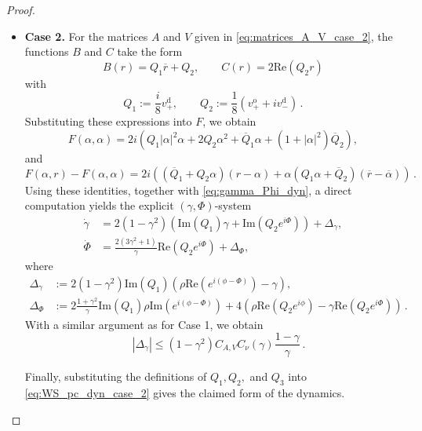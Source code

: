 \documentclass[10pt]{article}
\theoremstyle{definition}
\theoremstyle{definition}
\numberwithin{equation}{section}
\newcommand{\im}[1]{\mathrm{Im} \left(#1\right)}
\newcommand{\re}[1]{\mathrm{Re}\left(#1\right)}
\newcommand{\alphaBar}{\overline{\alpha}}
\newcommand{\vDPlus}{v_+^{\text{d}}}
\newcommand{\vDMinus}{v_-^{\text{d}}}
\newcommand{\vOPlus}{v_+^{\text{o}}}
\newcommand{\DeltaGamma}{\Delta_{\gamma}}
\newcommand{\DeltaPhi}{\Delta_{\Phi}}
\begin{document}
\begin{proof}
\begin{itemize}
    \item \textbf{Case 2.}
    For the matrices $A$ and $V$ given in \eqref{eq:matrices_A_V_case_2}, the functions $B$ and $C$ take the form
    \begin{equation*}
    B(r) = Q_1 \overline{r} + Q_2, \qquad C(r) = 2\re{Q_2 r}
    \end{equation*}
    with 
    \begin{equation*}
    Q_1 := \frac{i}{8} \vDPlus, \qquad Q_2 := \frac{1}{8} \left( \vOPlus + i \vDMinus \right) \, .
    \end{equation*}
    Substituting these expressions into $F$, we obtain
    \begin{equation*}
    F(\alpha, \alpha) = 2i \left( Q_1 |\alpha|^2 \alpha + 2 Q_2 \alpha^2 + \overline{Q}_1 \alpha + (1 + |\alpha|^2) \overline{Q}_2 \right),
    \end{equation*}
    and
    \begin{equation*}
    F(\alpha, r) - F(\alpha, \alpha) = 2i \left( \left( \overline{Q}_1 + Q_2 \alpha \right) (r - \alpha) + \alpha(Q_1 \alpha + \overline{Q}_2) (\overline{r} - \alphaBar) \right) \, .
    \end{equation*}
    Using these identities, together with \eqref{eq:gamma_Phi_dyn}, a direct computation yields the explicit $(\gamma,\Phi)$-system
    \begin{equation}\label{eq:WS_pc_dyn_case_2}
    \begin{aligned}
    \dot{\gamma} &= 2(1 - \gamma^2) \left(\im{Q_1} \gamma + \im{Q_2 e^{i\Phi}} \right) + \DeltaGamma,\\[4pt]
    \dot{\Phi} &= \frac{2(3\gamma^2 + 1)}{\gamma} \re{Q_2 e^{i\Phi}} + \DeltaPhi,
    \end{aligned}
    \end{equation}
    where
    \begin{equation}\label{eq:Delta_gamma_Phi_case2}
    \begin{aligned}
    \DeltaGamma &:= 2(1 - \gamma^2) \im{Q_1} \left( \rho \re{e^{i(\phi - \Phi)}} - \gamma \right),\\[4pt]
    \DeltaPhi &:= 2 \frac{1 + \gamma^2}{\gamma} \im{Q_1} \rho \im{e^{i(\phi - \Phi)}} + 4 \left( \rho \re{Q_2 e^{i\phi}} - \gamma \re{Q_2 e^{i\Phi}} \right) \, .
    \end{aligned}
    \end{equation}
    With a similar argument as for Case 1, we obtain
    \begin{equation*}
    \quad |\Delta_\gamma|\leq (1-\gamma^2) C_{A,V} C_\nu(\gamma)\frac{1-\gamma}{\gamma} \, .
    \end{equation*}

    Finally, substituting the definitions of $Q_1, Q_2,$ and $Q_3$ into \eqref{eq:WS_pc_dyn_case_2} gives the claimed form of the dynamics.
\end{itemize}
\end{proof}
\end{document}
